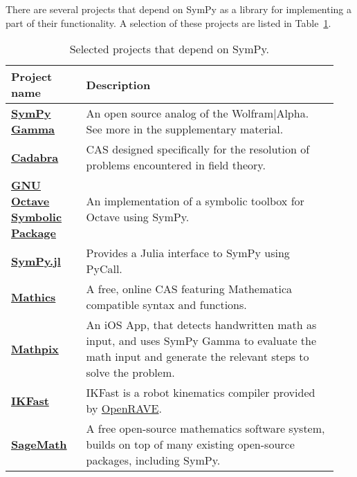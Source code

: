 There are several projects that depend on SymPy as a library for implementing
a part of their functionality. A selection of these projects are listed in
Table~\ref{projects-table}.

\begin{longtable}[htbc]{>{\raggedright}p{0.2\linewidth}p{0.74\linewidth}}
\caption{Selected projects that depend on SymPy.\label{projects-table}}\\
\toprule
\textbf{Project name} & \textbf{Description} \\
\midrule

\href{http://sympygamma.com/}{\textbf{SymPy Gamma}} & An open source
  analog of the Wolfram|Alpha.  See more in the supplementary material.~\cite{SymPyGamma} \\

\href{http://cadabra.science/index.html}{\textbf{Cadabra}}~\cite{Peeters2007cadabra} &
  CAS designed specifically for the resolution of problems
  encountered in field theory. \\

\href{https://github.com/cbm755/octsympy}{\textbf{GNU Octave Symbolic Package}}~\cite{OctSymPy} &
  An implementation of a symbolic toolbox for Octave using SymPy. \\

\href{https://github.com/jverzani/SymPy.jl}{\textbf{SymPy.jl}}~\cite{SymPy.jl} &
  Provides a Julia interface to SymPy using PyCall. \\

\href{https://mathics.github.io/}{\textbf{Mathics}}~\cite{Mathics} &
  A free, online CAS featuring Mathematica compatible
  syntax and functions. \\

\href{http://mathpix.com/}{\textbf{Mathpix}}~\cite{Mathpix} & An iOS App, that detects handwritten math as input, and uses
  SymPy Gamma to evaluate the math input and generate the relevant
  steps to solve the problem. \\

\href{http://openrave.org/docs/latest_stable/openravepy/ikfast/}{\textbf{IKFast}}~\cite{diankov2010ikfast} &
  IKFast is a robot kinematics compiler provided by
  \href{http://openrave.org/}{OpenRAVE}. \\

\href{http://www.sagemath.org/}{\textbf{SageMath}}~\cite{sagemath} &
  A free open-source mathematics software system, builds on top of many
  existing open-source packages, including SymPy. \\


\end{longtable}
